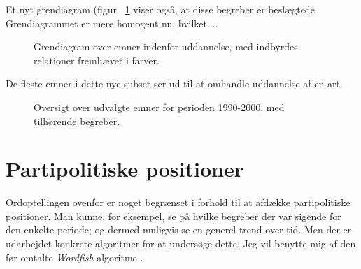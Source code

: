 Et nyt grendiagram (figur ~\ref{fig:dendro_edu} viser også, at disse begreber er beslægtede.
Grendiagrammet er mere homogent nu, hvilket....


\begin{figure}
 
\caption{Grendiagram over emner indenfor uddannelse, med indbyrdes relationer fremhævet i farver.}
\label{fig:dendro_edu}
\end{figure}


De fleste emner i dette nye subset ser ud til at omhandle uddannelse af en art.

\begin{figure}
\begin{adjustwidth}{-1in}{-1in}
  
\end{adjustwidth}
\caption{Oversigt over udvalgte emner for perioden 1990-2000, med tilhørende begreber.}
\label{fig:termsEdu}
\end{figure}

\section{Partipolitiske positioner}

Ordoptellingen ovenfor er noget begrænset i forhold til at afdække partipolitiske positioner.
Man kunne, for eksempel, se på hvilke begreber der var sigende for den enkelte periode; og dermed muligvis se en generel trend over tid.
Men der er udarbejdet konkrete algoritmer for at undersøge dette.
Jeg vil benytte mig af den før omtalte \textit{Wordfish}-algoritme \autocite{slapinScalingModelEstimating2008}.

